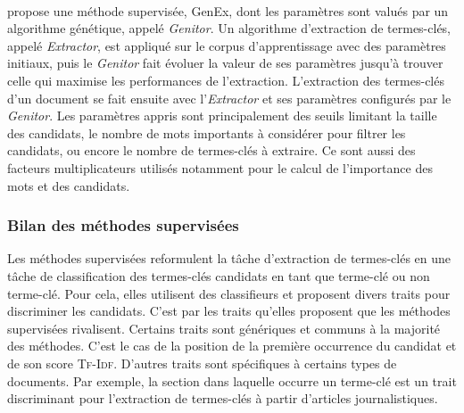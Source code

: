         ~\\ propose une méthode
        supervisée, GenEx, dont les paramètres sont valués par un algorithme
        génétique, appelé \textit{Genitor}. Un algorithme d'extraction de
        termes-clés, appelé \textit{Extractor}, est appliqué sur le corpus
        d'apprentissage avec des paramètres initiaux, puis le \textit{Genitor}
        fait évoluer la valeur de ses paramètres jusqu'à trouver celle qui
        maximise les performances de l'extraction. L'extraction des termes-clés
        d'un document se fait ensuite avec l'\textit{Extractor} et ses
        paramètres configurés par le \textit{Genitor}. Les paramètres appris
        sont principalement des seuils limitant la taille des candidats, le
        nombre de mots importants à considérer pour filtrer les candidats, ou
        encore le nombre de termes-clés à extraire. Ce sont aussi des facteurs
        multiplicateurs utilisés notamment pour le calcul de l'importance des
        mots et des candidats.

      \subsubsection{Bilan des méthodes supervisées}
      \label{subsubsec:main-state_of_the_art-automatic_keyphrase_extraction-supervised_keyphrase_extraction-conclusion}
        Les méthodes supervisées reformulent la tâche d'extraction de
        termes-clés en une tâche de classification des termes-clés candidats en
        tant que \og{}terme-clé\fg{} ou \og{}non terme-clé\fg{}. Pour cela,
        elles utilisent des classifieurs et proposent divers traits pour
        discriminer les candidats. C'est par les traits qu'elles proposent que
        les méthodes supervisées rivalisent. Certains traits sont génériques et
        communs à la majorité des méthodes. C'est le cas de la position de la
        première occurrence du candidat et de son score \textsc{Tf-Idf}.
        D'autres traits sont spécifiques à certains types de documents. Par
        exemple, la section dans laquelle occurre un terme-clé est un trait
        discriminant pour l'extraction de termes-clés à partir d'articles
        journalistiques.

